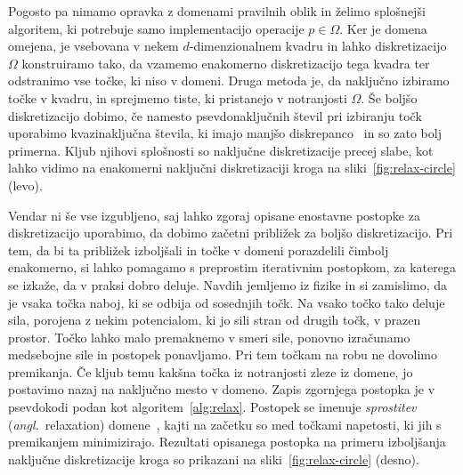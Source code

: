 \documentclass[12pt,a4paper,twoside]{article}
\theoremstyle{definition} %
\theoremstyle{plain} %
\numberwithin{equation}{section}
\newcommand{\ang}[1]{(\hspace{-1.5px}\textit{angl.}\ #1)}
\begin{document}
Pogosto pa nimamo opravka z domenami pravilnih oblik in želimo splošnejši algoritem, ki potrebuje
samo implementacijo operacije $p \in \Omega$. Ker je domena omejena, je vsebovana v nekem
$d$-dimenzionalnem kvadru in lahko diskretizacijo $\Omega$ konstruiramo tako, da vzamemo enakomerno
diskretizacijo tega kvadra ter odstranimo vse točke, ki niso v domeni. Druga metoda je, da
naključno izbiramo točke v kvadru, in sprejmemo tiste, ki pristanejo v notranjosti $\Omega$. Še
boljšo diskretizacijo dobimo, če namesto psevdonaključnih števil pri izbiranju točk
uporabimo kvazinaključna števila, ki imajo manjšo diskrepanco~\cite{morokoff1994quasi} in so zato
bolj primerna. Kljub njihovi splošnosti so naključne diskretizacije precej slabe, kot lahko vidimo
na enakomerni naključni diskretizaciji kroga na sliki~\ref{fig:relax-circle} (levo).

Vendar ni še vse izgubljeno, saj lahko zgoraj opisane enostavne postopke za diskretizacijo
uporabimo, da dobimo začetni približek za boljšo diskretizacijo. Pri tem, da bi ta približek
izboljšali in točke v domeni porazdelili čimbolj enakomerno, si lahko pomagamo s preprostim
iterativnim postopkom, za katerega se izkaže, da v praksi dobro deluje. Navdih jemljemo iz fizike in
si zamislimo, da je vsaka točka naboj, ki se odbija od sosednjih točk. Na vsako točko tako deluje
sila, porojena z nekim potencialom, ki jo sili stran od drugih točk, v prazen prostor. Točko lahko
malo premaknemo v smeri sile, ponovno izračunamo medsebojne sile in postopek ponavljamo. Pri tem
točkam na robu ne dovolimo premikanja. Če kljub temu kakšna točka iz notranjosti zleze iz domene, jo
postavimo nazaj na naključno mesto v domeno. Zapis zgornjega postopka je v psevdokodi podan kot
algoritem~\ref{alg:relax}. Postopek se imenuje \emph{sprostitev} \ang{relaxation}
domene~\cite[razdelek~2.2]{kosec2016local}, kajti na začetku so med točkami napetosti, ki jih s
premikanjem minimizirajo. Rezultati opisanega postopka na primeru izboljšanja naključne
diskretizacije kroga so prikazani na sliki~\ref{fig:relax-circle} (desno).
\end{document}
